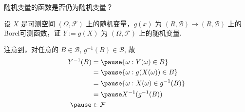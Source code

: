 \documentclass[Prob-All.tex]{subfiles}
\begin{document}
\begin{frame}{随机变量的函数是否仍为随机变量？}
	\vspace{0.5cm}
	\begin{thm}
		设 $X$ 是可测空间 $(\Omega,\mathcal{F})$ 上的随机变量，$g (x)$ 为 $(R,\mathcal{B})\rightarrow (R,\mathcal{B})$ 上的Borel可测函数，证 $Y:=g (X)$ 为 $(\Omega,\mathcal{F})$ 上的随机变量.
	\end{thm}

	\vspace{0.3cm}
	\pause
	\zheng 注意到，对任意的 $B\in \mathcal{B}$, $g^{-1}(B)\in \mathcal{B}$, 故 \pause
	\begin{align*}
		Y^{-1}(B) & =\pause \{\omega:Y(\omega)\in B\}         \\
		          & =\pause \{\omega:g(X(\omega))\in B\}      \\
		          & =\pause \{\omega:X(\omega)\in g^{-1}(B)\} \\
		          & =\pause X^{-1}(g^{-1}(B))                 \\ \pause
		          & \in  \mathcal{F}
	\end{align*}

\end{frame}
\end{document}
